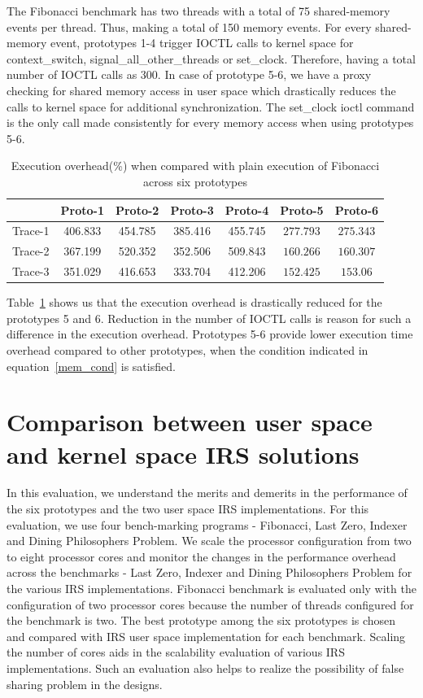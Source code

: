 The Fibonacci benchmark has two threads with a total of 75 shared-memory events per thread. 
Thus, making a total of 150 memory events. 
For every shared-memory event, prototypes 1-4 trigger IOCTL calls to kernel space for context\_switch, signal\_all\_other\_threads or set\_clock. 
Therefore, having a total number of IOCTL calls as 300. 
In case of prototype 5-6, we have a proxy checking for shared memory access  in user space which drastically reduces the calls to kernel space for additional synchronization. 
The set\_clock ioctl command is the only call made consistently for every memory access when using prototypes 5-6.

\begin{table}[h]
\begin{center}
 \begin{tabular}{|c c c c c c c|} 
 \hline
 & Proto-1 & Proto-2 & Proto-3 & Proto-4 & Proto-5 & Proto-6\\ %
 \hline
 Trace-1 & 406.833 & 454.785 & 385.416 & 455.745 & $277.793$ & $275.343$ \\ 
 Trace-2 & 367.199 & 520.352 & 352.506 & 509.843 & $160.266$ & $160.307$ \\
 Trace-3 & 351.029 & 416.653 & 333.704 & 412.206 & $152.425$ & $153.06$\\
 \hline
\end{tabular}
\end{center}
\caption{Execution overhead(\%) when compared with plain execution of Fibonacci across six prototypes}
\label{fib_exec_over}
\end{table}

Table~\ref{fib_exec_over} shows us that the execution overhead is drastically reduced for the prototypes 5 and 6. 
Reduction in the number of IOCTL calls is reason for such a difference in the execution overhead. 
Prototypes 5-6 provide lower execution time overhead compared to other prototypes, when the condition indicated in equation~\ref{mem_cond} is satisfied. 

\section{Comparison between user space and kernel space IRS solutions}

In this evaluation, we understand the merits and demerits in the performance of the six prototypes and the two user space IRS implementations. 
For this evaluation, we use four bench-marking programs - Fibonacci, Last Zero, Indexer and Dining Philosophers Problem. 
We scale the processor configuration from two to eight processor cores and monitor the changes in the performance overhead across the benchmarks - Last Zero, Indexer and Dining Philosophers Problem for the various IRS implementations. 
Fibonacci benchmark is evaluated only with the configuration of two processor cores because the number of threads configured for the benchmark is two. 
The best prototype among the six prototypes is chosen and compared with IRS user space implementation for each benchmark.
Scaling the number of cores aids in the scalability evaluation of various IRS implementations. 
Such an evaluation also helps to realize the possibility of false sharing problem in the designs. 

